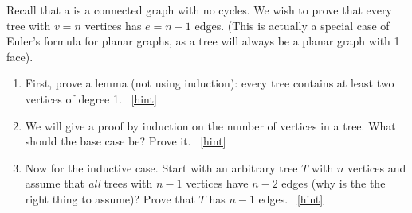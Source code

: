 \documentclass{book}
\begin{document}
\setcounter{project}{23}
\addtocounter{project}{-1}
\begin{activity}[]\label{activity-18}
\hypertarget{p-256}{}%
Recall that a  is a connected graph with no cycles.  We wish to prove that every tree with \(v = n\) vertices has \(e = n-1\) edges.  (This is actually a special case of Euler's formula for planar graphs, as a tree will always be a planar graph with 1 face).%
\begin{enumerate}[font=\bfseries,label=(\alph*),ref=\alph*]
\item\label{task-28} \hypertarget{p-257}{}%
First, prove a lemma (not using induction): every tree contains at least two vertices of degree 1.%
~\hfill{\tiny\hyperlink{a-23.a}{[hint]}\hypertarget{q-23.a}{}}\item\label{task-29} \hypertarget{p-259}{}%
We will give a proof by induction on the number of vertices in a tree.  What should the base case be?  Prove it.%
~\hfill{\tiny\hyperlink{a-23.b}{[hint]}\hypertarget{q-23.b}{}}\item\label{task-30} \hypertarget{p-261}{}%
Now for the inductive case.  Start with an arbitrary tree \(T\) with \(n\) vertices and assume that \emph{all} trees with \(n-1\) vertices have \(n-2\) edges (why is the the right thing to assume)?  Prove that \(T\) has \(n-1\) edges.%
~\hfill{\tiny\hyperlink{a-23.c}{[hint]}\hypertarget{q-23.c}{}}\end{enumerate}
\end{activity}
\end{document}
